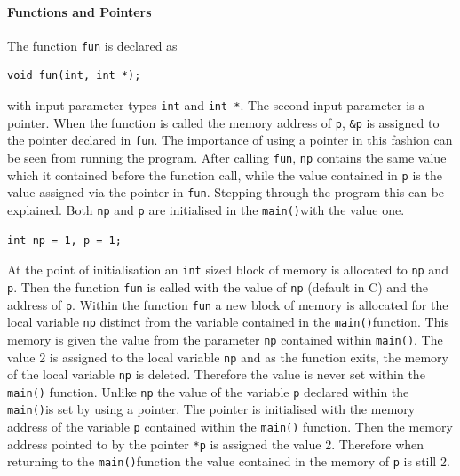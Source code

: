 \documentclass[11pt]{scrartcl}
\def\main{\texttt{main()}}
\begin{document}
\paragraph{Functions and Pointers}
The function \texttt{fun} is declared as 
\begin{lstlisting}
void fun(int, int *);
\end{lstlisting}
with input parameter types \texttt{int} and \texttt{int *}.  The
second input parameter is a pointer.  When the function is called the
memory address of \texttt{p}, \texttt{\&p} is assigned to the pointer
declared in \texttt{fun}.  The importance of using a pointer in this
fashion can be seen from running the program.  After calling
\texttt{fun}, \texttt{np} contains the same value which it contained
before the function call, while the value contained in \texttt{p} is
the value assigned via the pointer in
\texttt{fun}.  Stepping through the program this can be explained.
Both \texttt{np} and \texttt{p} are initialised in the \main with the
value one.
\begin{lstlisting}
int np = 1, p = 1;
\end{lstlisting}
At the point of initialisation an \texttt{int} sized block of memory
is allocated to \texttt{np} and \texttt{p}.  Then the function
\texttt{fun} is called with the value of \texttt{np} (default in C) and the
address of \texttt{p}.  Within the function \texttt{fun} a new block
of memory is allocated for the local variable \texttt{np} distinct
from the variable contained in the \main function.  This memory is
given the value from the parameter \texttt{np} contained within
\main.  The value 2 is assigned to the local variable \texttt{np}
and as the function exits, the memory of the local variable \texttt{np}
is deleted.  Therefore the value is never set within the \main
function.  Unlike \texttt{np} the value of the variable \texttt{p}
declared within
the \main is set by using a pointer.  The pointer is initialised with the
memory address of the variable \texttt{p} contained within the \main
function.  Then the memory address pointed to by the pointer
\texttt{*p} is assigned the value 2.  Therefore when returning to the
\main function the value contained in the memory of \texttt{p} is
still 2.
\end{document}
